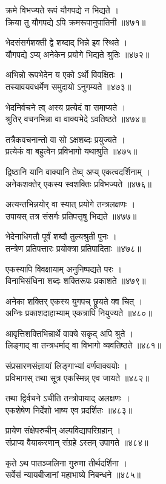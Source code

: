 क्रमे विभज्यते रूपं यौगपद्ये न भिद्यते ।\\क्रिया तु यौगपद्ये ऽपि क्रमरूपानुपातिनी ॥४७१॥

भेदसंसर्गशक्ती द्वे शब्दाद् भिन्ने इव स्थिते ।\\यौगपद्ये ऽप्य् अनेकेन प्रयोगे भिद्यते श्रुतिः ॥४७२॥

अभिन्नो रूपभेदेन य एको ऽर्थो विवक्षितः ।\\तस्यावयवधर्मेण समुदायो ऽनुगम्यते ॥४७३॥

भेदनिर्वचने त्व् अस्य प्रत्येदं वा समाप्यते ।\\श्रुतिर् वचनभिन्ना वा वाक्यभेदे ऽवतिष्ठते ॥४७४॥

तत्रैकवचनान्तो वा सो ऽक्षशब्दः प्रयुज्यते ।\\प्रत्येकं वा बहुत्वेन प्रविभागो यथाश्रुति ॥४७५॥

द्विष्ठानि यानि वाक्यानि तेष्व् अप्य् एकत्वदर्शिनाम् ।\\अनेकशक्तेर् एकस्य स्वशक्तिः प्रविभज्यते ॥४७६॥

अत्यन्तभिन्नयोर् वा स्यात् प्रयोगे तन्त्रलक्षणः ।\\उपायस् तत्र संसर्गः प्रतिपत्तृषु भिद्यते ॥४७७॥

भेदेनाधिगतौ पूर्वं शब्दौ तुल्यश्रुती पुनः ।\\तन्त्रेण प्रतिपत्तारः प्रयोक्त्रा प्रतिपादिताः ॥४७८॥

एकस्यापि विवक्षायाम् अनुनिष्पद्यते परः ।\\विनाभिसंधिना शब्दः शक्तिरूपः प्रकाशते ॥४७९॥

अनेका शक्तिर् एकस्य युगपच् छ्रूयते क्व चित् ।\\अग्निः प्रकाशदाहाभ्याम् एकत्रापि नियुज्यते ॥४८०॥

आवृत्तिशक्तिभिन्नार्थे वाक्ये सकृद् अपि श्रुते ।\\लिङ्गाद् वा तन्त्रधर्माद् वा विभागो व्यवतिष्ठते ॥४८१॥

संप्रसारणसंज्ञायां लिङ्गाभ्यां वर्णवाक्ययोः ।\\प्रविभागस् तथा सूत्र एकस्मिन्न् एव जायते ॥४८२॥

तथा द्विर्वचने ऽचीति तन्त्रोपायाद् अलक्षणः ।\\एकशेषेण निर्देशो भाष्य एव प्रदर्शितः ॥४८३॥

प्रायेण संक्षेपरुचीन् अल्पविद्यापरिग्रहान् ।\\संप्राप्य वैयाकरणान् संग्रहे ऽस्तम् उपागते ॥४८४॥

कृते ऽथ पातञ्जलिना गुरुणा तीर्थदर्शिना ।\\सर्वेसं न्यायबीजानां महाभाष्ये निबन्धने ॥४८५॥

